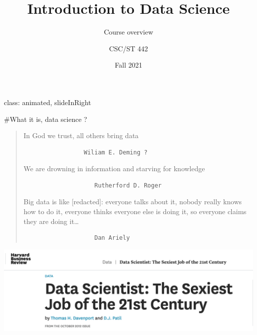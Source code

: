 \documentclass[
  ignorenonframetext,
]{beamer}
\title{Introduction to Data Science}
\subtitle{Course overview}
\author{CSC/ST 442}
\date{Fall 2021}
\begin{document}
\frame{\titlepage}

\begin{frame}[fragile]
class: animated, slideInRight

\#What it is, data science ?

\begin{quote}
In God we trust, all others bring data

\begin{verbatim}
                 Wiliam E. Deming ?
\end{verbatim}

We are drowning in information and starving for knowledge

\begin{verbatim}
                    Rutherford D. Roger
\end{verbatim}

Big data is like {[}redacted{]}: everyone talks about it, nobody really
knows how to do it, everyone thinks everyone else is doing it, so
everyone claims they are doing it\ldots{}

\begin{verbatim}
                    Dan Ariely
\end{verbatim}
\end{quote}

\begin{center}\includegraphics[width=0.8\linewidth]{figures/sexiest} \end{center}
\end{frame}
\end{document}
